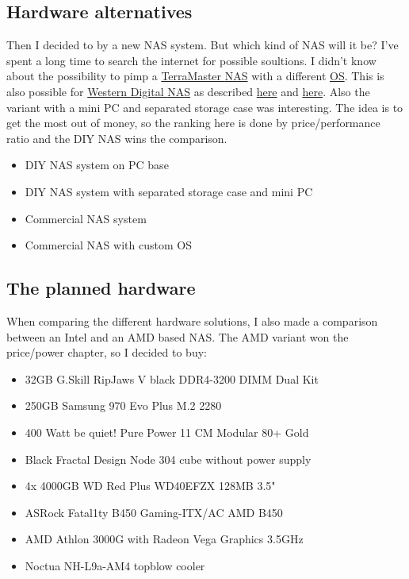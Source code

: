\subsection{Hardware alternatives}

Then I decided to by a new \gls{NAS} system. But which kind of \gls{NAS} will
it be? I've spent a long time to search the internet for possible soultions.
I didn't know about the possibility to pimp a \href{https://www.terra-master.com}{TerraMaster \gls{NAS}}
with a different \href{https://www.youtube.com/watch?v=f9Fh8XgREJ0}{OS}. This
is also possible for \href{https://www.westerndigital.com}{Western Digital \gls{NAS}}
as described \href{https://community.wd.com/t/firmware-freenas-on-pr4100-updated/218730/11}{here}
and \href{https://forum.openmediavault.org/index.php?thread/37009-can-i-install-omv-on-a-wd-nas/}{here}.
Also the variant with a mini PC and separated storage case was interesting. The
idea is to get the most out of money, so the ranking here is done by
price/performance ratio and the DIY \gls{NAS} wins the comparison.

\begin{itemize}
    \item DIY \gls{NAS} system on PC base
    \item DIY \gls{NAS} system with separated storage case and mini PC
    \item Commercial \gls{NAS} system
    \item Commercial \gls{NAS} with custom OS
\end{itemize}

\subsection{The planned hardware}

When comparing the different hardware solutions, I also made a comparison
between an Intel and an AMD based \gls{NAS}. The AMD variant won the price/power
chapter, so I decided to buy:

\begin{itemize}
    \item 32GB G.Skill RipJaws V black DDR4-3200 DIMM Dual Kit
    \item 250GB Samsung 970 Evo Plus M.2 2280
    \item 400 Watt be quiet! Pure Power 11 CM Modular 80+ Gold
    \item Black Fractal Design Node 304 cube without power supply
    \item 4x 4000GB WD Red Plus WD40EFZX 128MB 3.5"
    \item ASRock Fatal1ty B450 Gaming-ITX/AC AMD B450
    \item AMD Athlon 3000G with Radeon Vega Graphics 3.5GHz
    \item Noctua NH-L9a-AM4 topblow cooler
\end{itemize}

